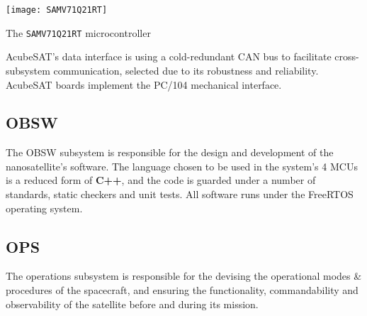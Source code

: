 \documentclass[a4paper,nobib]{tufte-book}
\begin{document}
\begin{marginfigure}
	\centering
	\texttt{[image: SAMV71Q21RT]}
	\caption{The \texttt{SAMV71Q21RT} microcontroller}
	\label{fig:samv71}
\end{marginfigure}

AcubeSAT's data interface is using a cold-redundant \ac{CAN} bus to facilitate cross-subsystem communication, selected due to its robustness and reliability. \autocite{bouwmeester_survey_implementation_2017} AcubeSAT boards implement the PC/104 mechanical interface.\autocite{PC104}

\subsection{\acf{OBSW}}

The \ac{OBSW} subsystem is responsible for the design and development of the nanosatellite's software. The language chosen to be used in the system's 4 \acp{MCU} is a reduced form of \textbf{C++}, and the code is guarded under a number of standards, static checkers and unit tests.\autocite{DDJF_OBSW} All software runs under the Free\acs{RTOS} operating system.



\subsection{\acf{OPS}}

The operations subsystem is responsible for the devising the operational modes \& procedures of the spacecraft, and ensuring the functionality, commandability and observability of the satellite before and during its mission.
\end{document}
